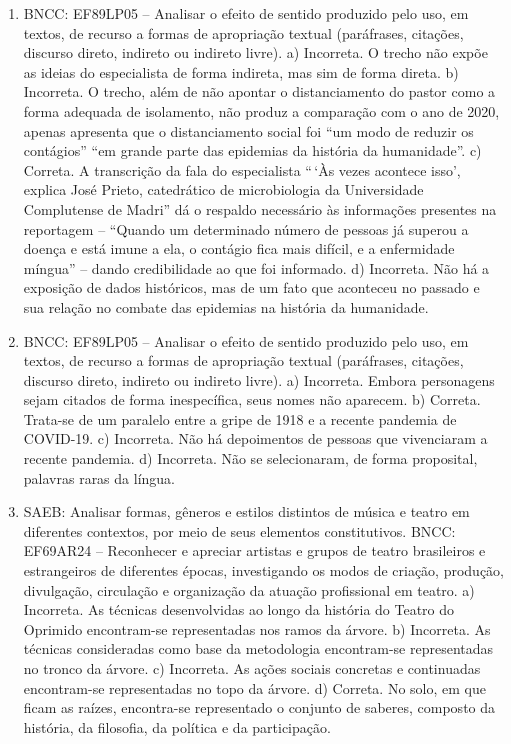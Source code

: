 \begin{enumerate}
\item
BNCC: EF89LP05 -- Analisar o efeito de sentido produzido pelo uso, em
textos, de recurso a formas de apropriação textual (paráfrases,
citações, discurso direto, indireto ou indireto livre).
a) Incorreta. O trecho não expõe as ideias do especialista de forma
indireta, mas sim de forma direta.
b) Incorreta. O trecho, além de não apontar o distanciamento do pastor
como a forma adequada de isolamento, não produz a comparação com o ano
de 2020, apenas apresenta que o distanciamento social foi ``um modo de
reduzir os contágios'' ``em grande parte das epidemias da história da
humanidade''.
c) Correta. A transcrição da fala do especialista ``\,`Às vezes acontece
isso', explica José Prieto, catedrático de microbiologia da Universidade
Complutense de Madri'' dá o respaldo necessário às informações presentes
na reportagem -- ``Quando um determinado número de pessoas já superou a
doença e está imune a ela, o contágio fica mais difícil, e a enfermidade
míngua'' -- dando credibilidade ao que foi informado.
d) Incorreta. Não há a exposição de dados históricos, mas de um fato que
aconteceu no passado e sua relação no combate das epidemias na história
da humanidade.

\item
BNCC: EF89LP05 -- Analisar o efeito de sentido produzido pelo uso, em
textos, de recurso a formas de apropriação textual (paráfrases,
citações, discurso direto, indireto ou indireto livre).
a) Incorreta. Embora personagens sejam citados de forma inespecífica,
seus nomes não aparecem.
b) Correta. Trata-se de um paralelo entre a gripe de 1918 e a recente
pandemia de COVID-19.
c) Incorreta. Não há depoimentos de pessoas que vivenciaram a recente
pandemia.
d) Incorreta. Não se selecionaram, de forma proposital, palavras raras
da língua.

\item
SAEB: Analisar formas, gêneros e estilos distintos de música e teatro
em diferentes contextos, por meio de seus elementos constitutivos.
BNCC: EF69AR24 -- Reconhecer e apreciar artistas e grupos de teatro
brasileiros e estrangeiros de diferentes épocas, investigando os modos
de criação, produção, divulgação, circulação e organização da atuação
profissional em teatro.
a) Incorreta. As técnicas desenvolvidas ao longo da história do Teatro
do Oprimido encontram-se representadas nos ramos da árvore.
b) Incorreta. As técnicas consideradas como base da metodologia
encontram-se representadas no tronco da árvore.
c) Incorreta. As ações sociais concretas e continuadas encontram-se
representadas no topo da árvore.
d) Correta. No solo, em que ficam as raízes, encontra-se representado o conjunto de saberes,
composto da história, da filosofia, da política e da participação.


\end{enumerate}
